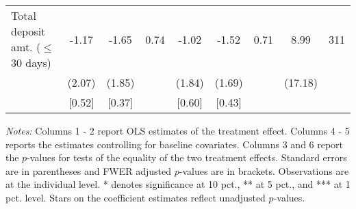 \begin{table}[htbp]
{\begin{threeparttable}
\begin{tabular}{l*{8}{c}}
Total deposit amt. ($\leq$ 30 days)&    -1.17&    -1.65&     0.74&    -1.02&    -1.52&     0.71&     8.99&      311\\
          &   (2.07)&   (1.85)&         &   (1.84)&   (1.69)&         &  (17.18)&         \\
          &   [0.52]&   [0.37]&         &   [0.60]&   [0.43]&         &         &         \\
\bottomrule \end{tabular} \begin{tablenotes}[flushleft] \footnotesize \item \emph{Notes:} Columns 1 - 2 report OLS estimates of the treatment effect. Columns 4 - 5 reports the estimates controlling for baseline covariates. Columns 3 and 6 report the \(p\)-values for tests of the equality of the two treatment effects. Standard errors are in parentheses and FWER adjusted \(p\)-values are in brackets. Observations are at the individual level. * denotes significance at 10 pct., ** at 5 pct., and *** at 1 pct. level. Stars on the coefficient estimates reflect unadjusted \(p\)-values. \end{tablenotes} \end{threeparttable} } \end{table}

